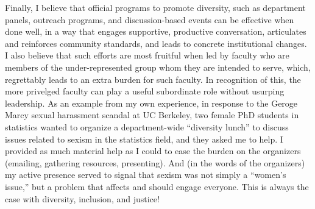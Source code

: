 Finally, I believe that official programs to promote diversity, such as
department panels, outreach programs, and discussion-based events can be
effective when done well, in a way that engages supportive, productive
conversation, articulates and reinforces community standards, and leads to
concrete institutional changes.  I also believe that such efforts are most
fruitful when led by faculty who are members of the under-represented group whom
they are intended to serve, which, regrettably leads to an extra burden for such
faculty. In recognition of this, the more privelged faculty can play a useful
subordinate role without usurping leadership.  As an example from my own
experience, in response to the Geroge Marcy sexual harassment scandal at UC
Berkeley, two female PhD students in statistics wanted to organize a
department-wide ``diversity lunch'' to discuss issues related to sexism in the
statistics field, and they asked me to help. I provided as much material help as
I could to ease the burden on the organizers (emailing, gathering resources,
presenting). And (in the words of the organizers) my active presence served to
signal that sexism was not simply a ``women's issue,'' but a problem that
affects and should engage everyone.  This is always the case with diversity,
inclusion, and justice!



